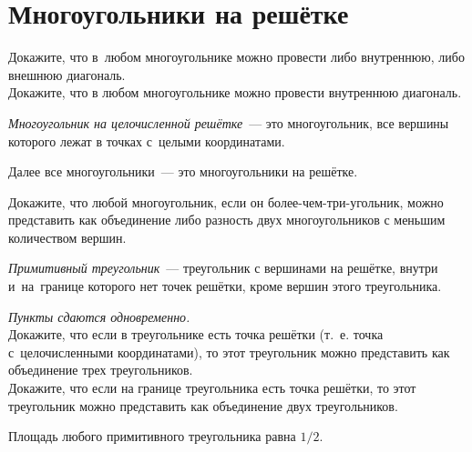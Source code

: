 
\section*{Многоугольники на решётке}


\begin{problems}

\item
\sp
Докажите, что в~любом многоугольнике можно провести либо внутреннюю,
либо внешнюю диагональ.
\\
\spx{*}
Докажите, что в любом многоугольнике можно провести внутреннюю диагональ.

\end{problems}

\emph{Многоугольник на целочисленной решётке}~--- это многоугольник, все
вершины которого лежат в точках с~целыми координатами.

Далее все многоугольники~--- это многоугольники на решётке.

\begin{problems}

\item
Докажите, что любой многоугольник, если он более-чем-три-угольник, можно
представить как объединение либо разность двух многоугольников
с меньшим количеством вершин.

\end{problems}

\emph{Примитивный треугольник}~--- треугольник с вершинами на решётке, внутри
и~на~границе которого нет точек решётки, кроме вершин этого треугольника.

\begin{problems}

\item
\emph{Пункты сдаются одновременно.}
\\
\sp
Докажите, что если в треугольнике есть точка решётки
(т.~е. точка с~целочисленными координатами),
то этот треугольник можно представить как объединение трех треугольников.
\\
\sp
Докажите, что если на границе треугольника есть точка решётки,
то этот треугольник можно представить как объединение двух треугольников.

\itemx{$^\circ$}
Площадь любого примитивного треугольника равна $1/2$.

\end{problems}

